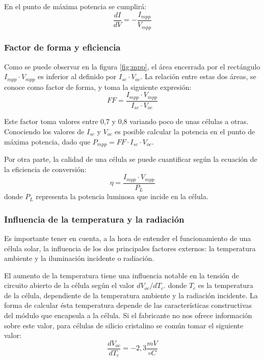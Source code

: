 En el punto de máxima potencia se cumplirá:
\begin{equation}
\frac{dI}{dV}=-\frac{I_{mpp}}{V_{mpp}}
\end{equation}
\subsubsection{Factor de forma y eficiencia}

Como se puede observar en la figura \ref{fig:mpp}, el área encerrada por el rectángulo $I_{mpp}\cdot V_{mpp}$ es inferior al definido por $I_{sc} \cdot V_{oc}$. La relación entre estas dos áreas, se conoce como factor de forma, y toma la siguiente expresión:
\begin{equation}
\label{eqn:FF}
FF = \frac{I_{mpp} \cdot V_{mpp}}{I_{sc} \cdot V_{oc}}
\end{equation}

Este factor toma valores entre 0,7 y 0,8 variando poco de unas células a otras. Conociendo los valores de $I_{sc}$ y $V_{oc}$ es posible calcular la potencia en el punto de máxima potencia, dado que $P_{mpp}=FF \cdot I_{sc} \cdot V_{oc}$.

Por otra parte, la calidad de una célula se puede cuantificar según la ecuación de la eficiencia de conversión:
\begin{equation}
\eta = \frac{I_{mpp} \cdot V_{mpp}}{P_L}
\end{equation}
donde $P_L$ representa la potencia luminosa que incide en la célula.

\subsubsection{Influencia de la temperatura y la radiación}

Es importante tener en cuenta, a la hora de entender el funcionamiento de una célula solar, la influencia de los dos principales factores externos: la temperatura ambiente y la iluminación incidente o radiación.

El aumento de la temperatura tiene una influencia notable en la tensión de circuito abierto de la célula según el valor $dV_{oc}/dT_c$. donde $T_c$ es la temperatura de la célula, dependiente de la temperatura ambiente y la radiación incidente. La forma de calcular ésta temperatura depende de las características constructivas del módulo que encapsula a la célula. Si el fabricante no nos ofrece información sobre este valor, para células de silicio cristalino se común tomar el siguiente valor:
\begin{equation}
\frac{dV_{oc}}{dT_c}=-2,3\frac{mV}{ \circ C}
\end{equation}

